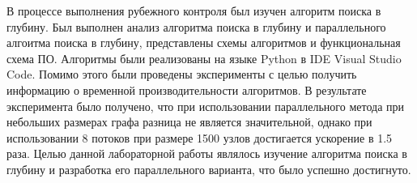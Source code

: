 \Conclusion
В процессе выполнения рубежного контроля был изучен алгоритм поиска в глубину. Был выполнен анализ алгоритма поиска в глубину и параллельного алгоитма поиска в глубину, представлены схемы алгоритмов и функциональная схема ПО. Алгоритмы были реализованы на языке Python в IDE Visual Studio Code. Помимо этого были проведены эксперименты с целью получить информацию о временной производительности алгоритмов. В результате эксперимента было получено, что при использовании параллельного метода при небольших размерах графа разница не является значительной, однако при использовании 8 потоков при размере 1500 узлов достигается ускорение в 1.5 раза.  Целью данной лабораторной работы являлось изучение алгоритма поиска в глубину и разработка его параллельного варианта, что было успешно достигнуто.